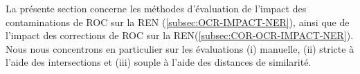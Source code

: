 La présente section concerne les méthodes d'évaluation de l'impact des contaminations de ROC sur la REN (\ref{subsec:OCR-IMPACT-NER}), ainsi que de l'impact des corrections de ROC sur la REN(\ref{subsec:COR-OCR-IMPACT-NER}). Nous nous concentrons en particulier sur les évaluations (i) manuelle, (ii) \og{}stricte\fg{} à l'aide des intersections et (iii) \og{}souple\fg{} à l'aide des distances de similarité.
